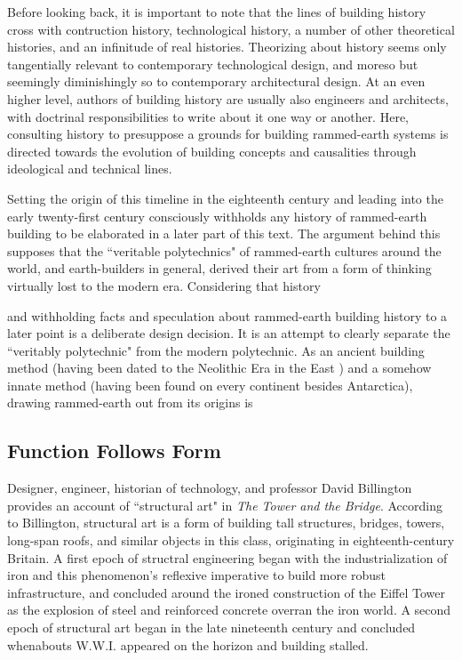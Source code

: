   \clearpage

Before looking back, it is important to note that the lines of building history cross with contruction history, technological history, a number of other theoretical histories, and an infinitude of real histories. Theorizing about history seems only tangentially relevant to contemporary technological design, and moreso but seemingly diminishingly so to contemporary architectural design. At an even higher level, authors of building history are usually also engineers and architects, with doctrinal responsibilities to write about it one way or another. \cite[p14]{CONSHISTORY} Here, consulting history to presuppose a grounds for building rammed-earth systems is directed towards the evolution of building concepts and causalities through ideological and technical lines.

Setting the origin of this timeline in the eighteenth century and leading into the early twenty-first century consciously withholds any history of rammed-earth building to be elaborated in a later part of this text. The argument behind this supposes that the ``veritable polytechnics" of rammed-earth cultures around the world, and earth-builders in general, derived their art from a form of thinking virtually lost to the modern era. Considering that history

and withholding facts and speculation about rammed-earth building history to a later point is a deliberate design decision. It is an attempt to clearly separate the ``veritably polytechnic" from the modern polytechnic. As an ancient building method (having been dated to the Neolithic Era in the East \cite{CHINESEARCHITECTURE}) and a somehow innate method (having been found on every continent besides Antarctica), drawing rammed-earth out from its origins is


\clearpage

\subsection{Function Follows Form}

Designer, engineer, historian of technology, and professor David Billington provides an account of ``structural art" in \textit{The Tower and the Bridge}. According to Billington, structural art is a form of building tall structures, bridges, towers, long-span roofs, and similar objects in this class, originating in eighteenth-century Britain. A first epoch of structral engineering began with the industrialization of iron and this phenomenon's reflexive imperative to build more robust infrastructure, and concluded around the ironed construction of the Eiffel Tower as the explosion of steel and reinforced concrete overran the iron world. A second epoch of structural art began in the late nineteenth century and concluded whenabouts W.W.I. appeared on the horizon and building stalled. \cite[p7]{TOWERANDBRIDGE}


